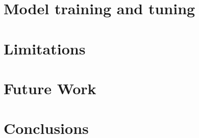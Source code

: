 \documentclass[sigconf]{acmart}
\begin{document}
\section{Model training and tuning}
\label{sec:method}


\section{Limitations}
\label{sec:method}


\section{Future Work}
\label{sec:method}


\section{Conclusions}
\label{sec:method}




\end{document}
